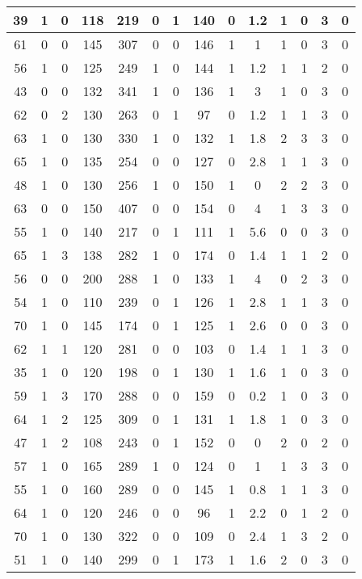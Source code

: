 \documentclass{article}
\begin{document}
\begin{longtable}{|c|c|c|c|c|c|c|c|c|c|c|c|c|c|}
\hline
39 & 1 & 0 & 118 & 219 & 0 & 1 & 140 & 0 & 1.2 & 1 & 0 & 3 & 0\\
\hline
61 & 0 & 0 & 145 & 307 & 0 & 0 & 146 & 1 & 1 & 1 & 0 & 3 & 0\\
\hline
56 & 1 & 0 & 125 & 249 & 1 & 0 & 144 & 1 & 1.2 & 1 & 1 & 2 & 0\\
\hline
43 & 0 & 0 & 132 & 341 & 1 & 0 & 136 & 1 & 3 & 1 & 0 & 3 & 0\\
\hline
62 & 0 & 2 & 130 & 263 & 0 & 1 & 97 & 0 & 1.2 & 1 & 1 & 3 & 0\\
\hline
63 & 1 & 0 & 130 & 330 & 1 & 0 & 132 & 1 & 1.8 & 2 & 3 & 3 & 0\\
\hline
65 & 1 & 0 & 135 & 254 & 0 & 0 & 127 & 0 & 2.8 & 1 & 1 & 3 & 0\\
\hline
48 & 1 & 0 & 130 & 256 & 1 & 0 & 150 & 1 & 0 & 2 & 2 & 3 & 0\\
\hline
63 & 0 & 0 & 150 & 407 & 0 & 0 & 154 & 0 & 4 & 1 & 3 & 3 & 0\\
\hline
55 & 1 & 0 & 140 & 217 & 0 & 1 & 111 & 1 & 5.6 & 0 & 0 & 3 & 0\\
\hline
65 & 1 & 3 & 138 & 282 & 1 & 0 & 174 & 0 & 1.4 & 1 & 1 & 2 & 0\\
\hline
56 & 0 & 0 & 200 & 288 & 1 & 0 & 133 & 1 & 4 & 0 & 2 & 3 & 0\\
\hline
54 & 1 & 0 & 110 & 239 & 0 & 1 & 126 & 1 & 2.8 & 1 & 1 & 3 & 0\\
\hline
70 & 1 & 0 & 145 & 174 & 0 & 1 & 125 & 1 & 2.6 & 0 & 0 & 3 & 0\\
\hline
62 & 1 & 1 & 120 & 281 & 0 & 0 & 103 & 0 & 1.4 & 1 & 1 & 3 & 0\\
\hline
35 & 1 & 0 & 120 & 198 & 0 & 1 & 130 & 1 & 1.6 & 1 & 0 & 3 & 0\\
\hline
59 & 1 & 3 & 170 & 288 & 0 & 0 & 159 & 0 & 0.2 & 1 & 0 & 3 & 0\\
\hline
64 & 1 & 2 & 125 & 309 & 0 & 1 & 131 & 1 & 1.8 & 1 & 0 & 3 & 0\\
\hline
47 & 1 & 2 & 108 & 243 & 0 & 1 & 152 & 0 & 0 & 2 & 0 & 2 & 0\\
\hline
57 & 1 & 0 & 165 & 289 & 1 & 0 & 124 & 0 & 1 & 1 & 3 & 3 & 0\\
\hline
55 & 1 & 0 & 160 & 289 & 0 & 0 & 145 & 1 & 0.8 & 1 & 1 & 3 & 0\\
\hline
64 & 1 & 0 & 120 & 246 & 0 & 0 & 96 & 1 & 2.2 & 0 & 1 & 2 & 0\\
\hline
70 & 1 & 0 & 130 & 322 & 0 & 0 & 109 & 0 & 2.4 & 1 & 3 & 2 & 0\\
\hline
51 & 1 & 0 & 140 & 299 & 0 & 1 & 173 & 1 & 1.6 & 2 & 0 & 3 & 0\\

\end{longtable}
\end{document}
